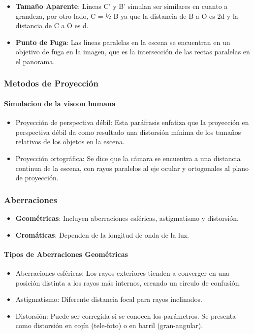 \begin{itemize}
	\item \textbf{Tamaño Aparente}: Líneas C' y B' simulan ser similares en cuanto a grandeza, por otro lado, C = ½ B ya que la distancia de B a O es 2d y la distancia de C a O es d.
	\item \textbf{Punto de Fuga}: Las líneas paralelas en la escena se encuentran en un objetivo de fuga en la imagen, que es la intersección de las rectas paralelas en el panorama.
\end{itemize}


\subsubsection{Metodos de Proyección}

\paragraph{Simulacion de la visoon humana }

\begin{itemize}
	\item Proyección de perspectiva débil: Esta paráfrasis enfatiza que la proyección en perspectiva débil da como resultado una distorsión mínima de los tamaños relativos de los objetos en la escena.
	\item Proyección ortográfica: Se dice que la cámara se encuentra a una distancia continua de la escena, con rayos paralelos al eje ocular y ortogonales al plano de proyección.
\end{itemize}


\subsubsection{Aberraciones}

\begin{itemize}
	\item \textbf{Geométricas}: Incluyen aberraciones esféricas, astigmatismo y distorsión.
	\item \textbf{Cromáticas}: Dependen de la longitud de onda de la luz.
\end{itemize}

\paragraph{Tipos de Aberraciones Geométricas}

\begin{itemize}
	\item Aberraciones esféricas: Los rayos exteriores tienden a converger en una posición distinta a los rayos más internos, creando un círculo de confusión.
	\item Astigmatismo: Diferente distancia focal para rayos inclinados.
	\item Distorsión: Puede ser corregida si se conocen los parámetros. Se presenta como distorsión en cojín (tele-foto) o en barril (gran-angular).
\end{itemize}



